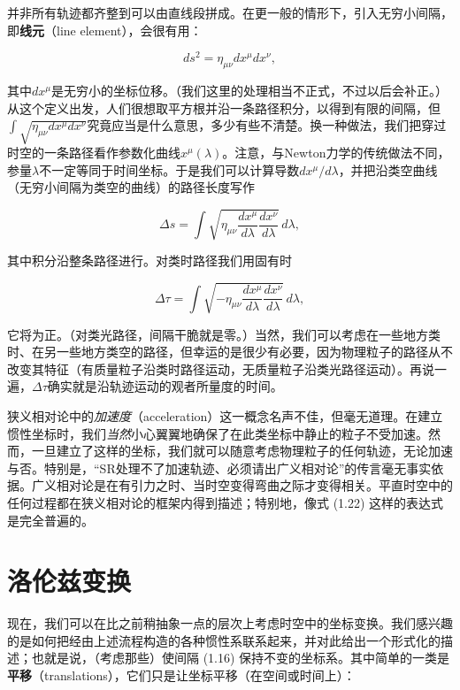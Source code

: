 并非所有轨迹都齐整到可以由直线段拼成。在更一般的情形下，引入无穷小间隔，即\textbf{线元}（line element），会很有用：

\begin{equation*}
\boxed{ds^2 = \eta_{\mu\nu}dx^\mu dx^\nu,}
\tag{1.20}
\end{equation*}

其中$dx^\mu$是无穷小的坐标位移。（我们这里的处理相当不正式，不过以后会补正。）从这个定义出发，人们很想取平方根并沿一条路径积分，以得到有限的间隔，但$\int\sqrt{\eta_{\mu\nu}dx^\mu dx^\nu}$究竟应当是什么意思，多少有些不清楚。换一种做法，我们把穿过时空的一条路径看作参数化曲线$x^\mu(\lambda)$。注意，与Newton力学的传统做法不同，参量$\lambda$不一定等同于时间坐标。于是我们可以计算导数$dx^\mu/d\lambda$，并把沿类空曲线（无穷小间隔为类空的曲线）的路径长度写作

\begin{equation*}
\Delta s = \int \sqrt{\eta_{\mu\nu}\frac{dx^\mu}{d\lambda}\frac{dx^\nu}{d\lambda}}\,d\lambda,
\tag{1.21}
\end{equation*}

其中积分沿整条路径进行。对类时路径我们用固有时

\begin{equation*}
\Delta\tau = \int \sqrt{-\eta_{\mu\nu}\frac{dx^\mu}{d\lambda}\frac{dx^\nu}{d\lambda}}\,d\lambda,
\tag{1.22}
\end{equation*}

它将为正。（对类光路径，间隔干脆就是零。）当然，我们可以考虑在一些地方类时、在另一些地方类空的路径，但幸运的是很少有必要，因为物理粒子的路径从不改变其特征（有质量粒子沿类时路径运动，无质量粒子沿类光路径运动）。再说一遍，$\Delta\tau$确实就是沿轨迹运动的观者所量度的时间。

狭义相对论中的\emph{加速度}（acceleration）这一概念名声不佳，但毫无道理。在建立惯性坐标时，我们\emph{当然}小心翼翼地确保了在此类坐标中静止的粒子不受加速。然而，一旦建立了这样的坐标，我们就可以随意考虑物理粒子的任何轨迹，无论加速与否。特别是，“SR处理不了加速轨迹、必须请出广义相对论”的传言毫无事实依据。广义相对论是在有引力之时、当时空变得弯曲之际才变得相关。平直时空中的任何过程都在狭义相对论的框架内得到描述；特别地，像式 (1.22) 这样的表达式是完全普遍的。

\section{洛伦兹变换}

现在，我们可以在比之前稍抽象一点的层次上考虑时空中的坐标变换。我们感兴趣的是如何把经由上述流程构造的各种惯性系联系起来，并对此给出一个形式化的描述；也就是说，（考虑那些）使间隔 (1.16) 保持不变的坐标系。其中简单的一类是\textbf{平移}（translations），它们只是让坐标平移（在空间或时间上）：

